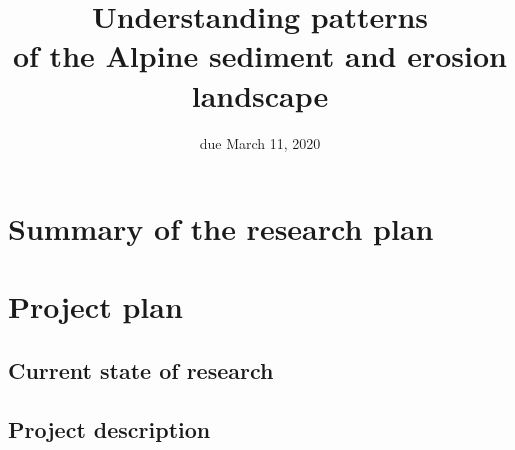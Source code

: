 \documentclass{article}
\title{Understanding patterns\\of the Alpine sediment and erosion landscape}
\author{}
\date{due March 11, 2020}
\begin{document}

\maketitle

\section{Summary of the research plan}


\newpage

\section{Project plan}


\subsection{Current state of research}


\subsection{Project description}

\end{document}
